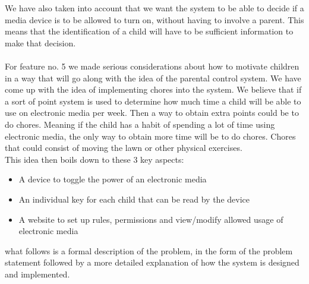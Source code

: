 We have also taken into account that we want the system to be able to decide if a media device is to be allowed to turn on, without having to involve a parent. This means that the identification of a child will have to be sufficient information to make that decision.\\
\\
For feature no. 5 we made serious considerations about how to motivate children in a way that will go along with the idea of the parental control system. We have come up with the idea of implementing chores into the system. We believe that if a sort of point system is used to determine how much time a child will be able to use on electronic media per week. Then a way to obtain extra points could be to do chores. Meaning if the child has a habit of spending a lot of time using electronic media, the only way to obtain more time will be to do chores. Chores that could consist of moving the lawn or other physical exercises.\\

This idea then boils down to these 3 key aspects:

\begin{itemize}
	\item A device to toggle the power of an electronic media
	\item An individual key for each child that can be read by the device
	\item A website to set up rules, permissions and view/modify allowed usage of electronic media
\end{itemize} 

what follows is a formal description of the problem, in the form of the problem statement followed by a more detailed explanation of how the system is designed and implemented.
